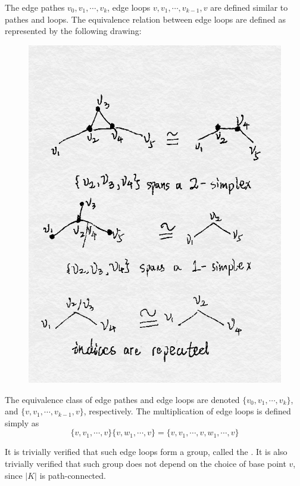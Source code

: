 The edge pathes $v_0,v_1,\cdots,v_k$, edge loops
$v,v_1,\cdots,v_{k-1},v$ are defined similar to pathes and loops.
The equivalence relation between edge loops are defined as represented
by the following drawing:
\begin{figure}[H]
    \centering
    \includegraphics[width=0.8\linewidth]{pics/ch6-notes-2/edge-group1.png}
\end{figure}

The equivalence class of edge pathes and edge loops are denoted
$\{v_0,v_1,\cdots,v_k\}$, and $\{v,v_1,\cdots,v_{k-1},v\}$,
respectively. The multiplication of edge loops is defined simply as
\begin{equation}
    \{v,v_1,\cdots,v\}\{v,w_1,\cdots,v\} =
    \{v,v_1,\cdots,v,w_1,\cdots,v\}
\end{equation}

It is trivially verified that such edge loops form a group, called the
. It is also trivially
verified that such group does not depend on the choice of base point
$v$, since $|K|$ is path-connected.

